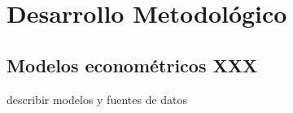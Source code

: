 
\chapter{Desarrollo Metodológico} \label{MCP:subastador} %


\section{Modelos econométricos XXX}

describir modelos y fuentes de datos
